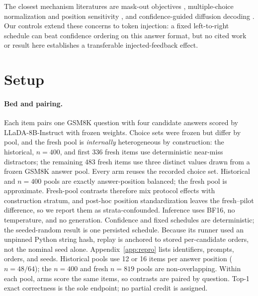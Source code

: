 \documentclass{article}
\begin{document}
The closest mechanism literatures are mask-out objectives
\citep{nie2025llada,nie2026illada,sahoo2024mdlm}, multiple-choice
normalization and position sensitivity \citep{holtzman2021surface,zheng2024selection},
and confidence-guided diffusion decoding \citep{nie2025llada}.  Our controls
extend these concerns to token injection: a fixed left-to-right schedule can
beat confidence ordering on this answer format, but no cited work or result
here establishes a transferable injected-feedback effect.

\section{Setup}
\label{sec:setup}

\paragraph{Bed and pairing.}
Each item pairs one GSM8K question with four candidate answers scored by
LLaDA-8B-Instruct \citep{nie2025llada} with frozen weights.  Choice sets were
frozen but differ by pool, and the fresh pool is \emph{internally}
heterogeneous by construction: the historical, $n=400$, and first 336 fresh
items use deterministic near-miss distractors; the remaining 483 fresh items
use three distinct values drawn from a frozen GSM8K answer pool.  Every arm
reuses the recorded choice set.  Historical and $n=400$ pools are exactly
answer-position balanced; the fresh pool is approximate.  Fresh-pool contrasts
therefore mix protocol effects with construction stratum, and post-hoc position
standardization leaves the fresh--pilot difference, so we report them as
strata-confounded.  Inference uses BF16, no temperature,
and no generation.  Confidence and fixed schedules are deterministic; the
seeded-random result is one persisted schedule.  Because its runner used an
unpinned Python string hash, replay is anchored to stored per-candidate orders,
not the nominal seed alone.  Appendix~\ref{app:repro} lists identifiers,
prompts, orders, and seeds.  Historical pools use 12 or 16 items per answer
position ($n=48/64$); the $n=400$ and fresh $n=819$ pools are non-overlapping.
Within each pool, arms score the same items, so contrasts are paired by
question.  Top-1 exact correctness is the sole endpoint; no partial credit is
assigned.
\end{document}
